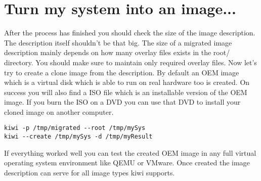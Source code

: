 \section{Turn my system into an image...}
After the process has finished you should check the size of the
image description. The description itself shouldn't be that big.
The size of a migrated image description mainly depends on how many
overlay files exists in the root/ directory. You should make
sure to maintain only required overlay files. Now let's try to create a
clone image from the description. By default an OEM image which is
a virtual disk which is able to run on real hardware too is created.
On success you will also find a ISO file which is an installable
version of the OEM image. If you burn the ISO on a DVD you can use
that DVD to install your cloned image on another computer.

\begin{Command}{14cm}
\begin{verbatim}
kiwi -p /tmp/migrated --root /tmp/mySys
kiwi --create /tmp/mySys -d /tmp/myResult
\end{verbatim}
\end{Command}

If everything worked well you can test the created OEM
image in any full virtual operating system environment like QEMU or
VMware. Once created the image description can serve for all image
types kiwi supports.
 
